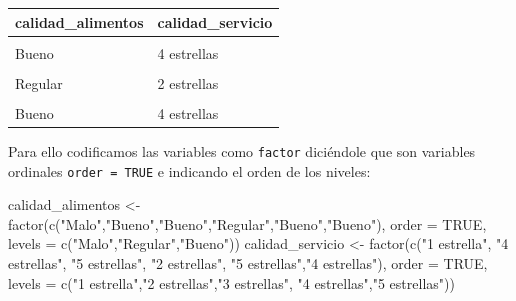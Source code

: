 \documentclass[
]{book}
\newenvironment{Shaded}{\begin{snugshade}}{\end{snugshade}}
\newcommand{\AttributeTok}[1]{\textcolor[rgb]{0.77,0.63,0.00}{#1}}
\newcommand{\ConstantTok}[1]{\textcolor[rgb]{0.00,0.00,0.00}{#1}}
\newcommand{\FunctionTok}[1]{\textcolor[rgb]{0.00,0.00,0.00}{#1}}
\newcommand{\NormalTok}[1]{#1}
\newcommand{\OtherTok}[1]{\textcolor[rgb]{0.56,0.35,0.01}{#1}}
\newcommand{\StringTok}[1]{\textcolor[rgb]{0.31,0.60,0.02}{#1}}
\begin{document}
\begin{table}
\centering
\begin{tabular}{l|l}
\hline
calidad\_alimentos & calidad\_servicio\\
\hline
\cellcolor{gray!6}{Malo} & \cellcolor{gray!6}{1 estrella}\\
\hline
Bueno & 4 \vphantom{1} estrellas\\
\hline
\cellcolor{gray!6}{Bueno} & \cellcolor{gray!6}{5 \vphantom{1} estrellas}\\
\hline
Regular & 2 estrellas\\
\hline
\cellcolor{gray!6}{Bueno} & \cellcolor{gray!6}{5 estrellas}\\
\hline
Bueno & 4 estrellas\\
\hline
\end{tabular}
\end{table}

Para ello codificamos las variables como \texttt{factor} diciéndole que son variables ordinales \texttt{order\ =\ TRUE} e indicando el orden de los niveles:

\begin{Shaded}
\begin{Highlighting}[]
\NormalTok{calidad\_alimentos }\OtherTok{\textless{}{-}} \FunctionTok{factor}\NormalTok{(}\FunctionTok{c}\NormalTok{(}\StringTok{"Malo"}\NormalTok{,}\StringTok{"Bueno"}\NormalTok{,}\StringTok{"Bueno"}\NormalTok{,}\StringTok{"Regular"}\NormalTok{,}\StringTok{"Bueno"}\NormalTok{,}\StringTok{"Bueno"}\NormalTok{),}
                            \AttributeTok{order =} \ConstantTok{TRUE}\NormalTok{, }
                            \AttributeTok{levels =} \FunctionTok{c}\NormalTok{(}\StringTok{"Malo"}\NormalTok{,}\StringTok{"Regular"}\NormalTok{,}\StringTok{"Bueno"}\NormalTok{))}
\NormalTok{calidad\_servicio }\OtherTok{\textless{}{-}} \FunctionTok{factor}\NormalTok{(}\FunctionTok{c}\NormalTok{(}\StringTok{"1 estrella"}\NormalTok{, }\StringTok{"4 estrellas"}\NormalTok{,  }\StringTok{"5 estrellas"}\NormalTok{, }
                             \StringTok{"2 estrellas"}\NormalTok{, }\StringTok{"5 estrellas"}\NormalTok{,}\StringTok{"4 estrellas"}\NormalTok{),}
                            \AttributeTok{order =} \ConstantTok{TRUE}\NormalTok{, }
                            \AttributeTok{levels =} \FunctionTok{c}\NormalTok{(}\StringTok{"1 estrella"}\NormalTok{,}\StringTok{"2 estrellas"}\NormalTok{,}\StringTok{"3 estrellas"}\NormalTok{,}
                                       \StringTok{"4 estrellas"}\NormalTok{,}\StringTok{"5 estrellas"}\NormalTok{))}
\end{Highlighting}
\end{Shaded}
\end{document}
